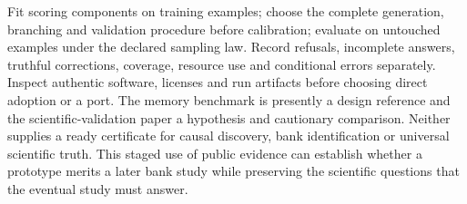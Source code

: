 Fit scoring components on training examples; choose the complete generation,
branching and validation procedure before calibration; evaluate on untouched
examples under the declared sampling law. Record refusals, incomplete answers,
truthful corrections, coverage, resource use and conditional errors separately.
Inspect authentic software, licenses and run artifacts before choosing direct
adoption or a port. The memory benchmark is presently a design reference and
the scientific-validation paper a hypothesis and cautionary comparison.
Neither supplies a ready certificate for causal discovery, bank identification
or universal scientific truth. This staged use of public evidence can establish
whether a prototype merits a later bank study while preserving the scientific
questions that the eventual study must answer.
